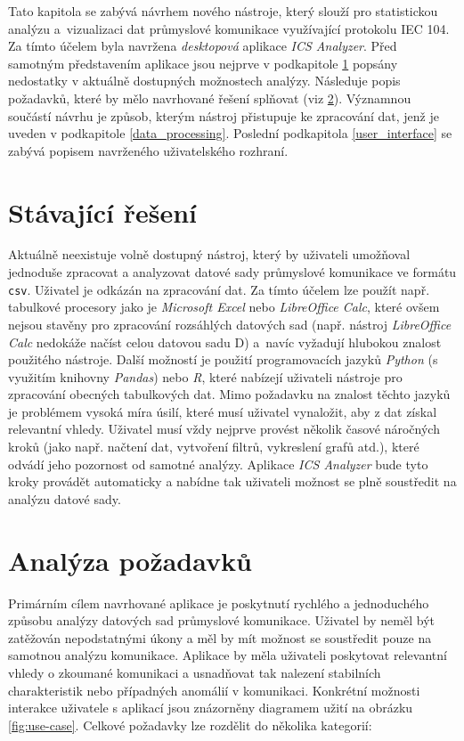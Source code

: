 Tato kapitola se zabývá návrhem nového nástroje, který slouží pro statistickou analýzu a~vizualizaci dat průmyslové komunikace využívající protokolu IEC 104. Za tímto účelem byla navržena \emph{desktopová} aplikace \emph{ICS Analyzer}. Před samotným představením aplikace jsou nejprve v podkapitole \ref{actual_solution} popsány nedostatky v aktuálně dostupných možnostech analýzy. Následuje popis požadavků, které by mělo navrhované řešení splňovat (viz \ref{requirements}). Významnou součástí návrhu je způsob, kterým nástroj přistupuje ke zpracování dat, jenž je uveden v podkapitole \ref{data_processing}. Poslední podkapitola \ref{user_interface} se zabývá popisem navrženého uživatelského rozhraní.


\section{Stávající řešení}
\label{actual_solution}

Aktuálně neexistuje volně dostupný nástroj, který by uživateli umožňoval jednoduše zpracovat a analyzovat datové sady průmyslové komunikace ve formátu \texttt{csv}. Uživatel je odkázán na  zpracování dat. Za tímto účelem lze použít např. tabulkové procesory jako je \emph{Microsoft Excel} nebo \emph{LibreOffice Calc}, které ovšem nejsou stavěny pro zpracování rozsáhlých datových sad (např. nástroj \emph{LibreOffice Calc} nedokáže načíst celou datovou sadu D) a~navíc vyžadují hlubokou znalost použitého nástroje. Další možností je použití programovacích jazyků \emph{Python} (s využitím knihovny \emph{Pandas}) nebo \emph{R}, které nabízejí uživateli nástroje pro zpracování obecných tabulkových dat. Mimo požadavku na znalost těchto jazyků je problémem vysoká míra úsilí, které musí uživatel vynaložit, aby z dat získal relevantní vhledy. Uživatel musí vždy nejprve provést několik časové náročných kroků (jako např. načtení dat, vytvoření filtrů, vykreslení grafů atd.), které odvádí jeho pozornost od samotné analýzy. Aplikace \emph{ICS Analyzer} bude tyto kroky provádět automaticky a nabídne tak uživateli možnost se plně soustředit na analýzu datové sady.


\section{Analýza požadavků}
\label{requirements}

Primárním cílem navrhované aplikace je poskytnutí rychlého a jednoduchého způsobu analýzy datových sad průmyslové komunikace. Uživatel by neměl být zatěžován nepodstatnými úkony a měl by mít možnost se soustředit pouze na samotnou analýzu komunikace. Aplikace by měla uživateli poskytovat relevantní vhledy o zkoumané komunikaci a usnadňovat tak nalezení stabilních charakteristik nebo případných anomálií v komunikaci. Konkrétní možnosti interakce uživatele s aplikací jsou znázorněny diagramem užití na obrázku \ref{fig:use-case}. Celkové požadavky lze rozdělit do několika kategorií:

